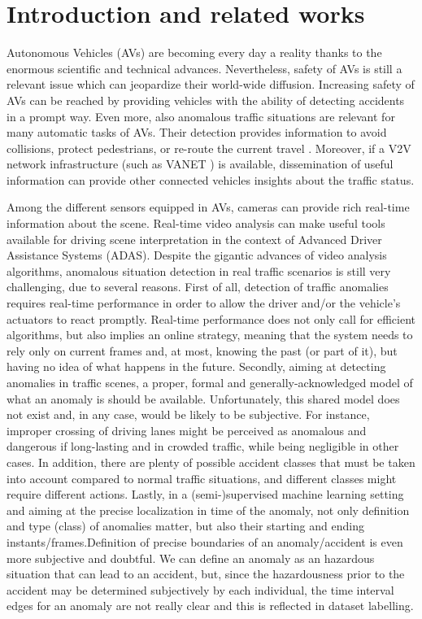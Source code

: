 \section{Introduction and related works}
Autonomous Vehicles (AVs) are becoming every day a reality thanks to the enormous scientific and technical advances. Nevertheless, safety of AVs is still a relevant issue which can jeopardize their world-wide diffusion.
Increasing safety of AVs can be reached by providing vehicles with the ability of detecting accidents in a prompt way.
Even more, also anomalous traffic situations are relevant for many automatic tasks of AVs.
Their detection provides information to avoid collisions, protect pedestrians, or re-route the current travel \cite{4298901}.
Moreover, if a V2V network infrastructure (such as VANET \cite{fatemidokht2021efficient}) is available, dissemination of useful information can provide other connected vehicles insights about the traffic status. 

Among the different sensors equipped in AVs, cameras can provide rich real-time information about the scene.
Real-time video analysis can make useful tools available for driving scene interpretation in the context of Advanced Driver Assistance Systems (ADAS).
Despite the gigantic advances of video analysis algorithms, anomalous situation detection in real traffic scenarios is still very challenging, due to several reasons.
First of all, detection of traffic anomalies requires real-time performance in order to allow the driver and/or the vehicle's actuators to react promptly.
Real-time performance does not only call for efficient algorithms, but also implies an online strategy, meaning that the system needs to rely only on current frames and, at most, knowing the past (or part of it), but having no idea of what happens in the future.
Secondly, aiming at detecting anomalies in traffic scenes, a proper, formal and generally-acknowledged model of what an anomaly is should be available.
Unfortunately, this shared model does not exist and, in any case, would be likely to be subjective.
For instance, improper crossing of driving lanes might be perceived as anomalous and dangerous if long-lasting and in crowded traffic, while being negligible in other cases.
In addition, there are plenty of possible accident classes that must be taken into account compared to normal traffic situations, and different classes might require different actions.
Lastly, in a (semi-)supervised machine learning setting and aiming at the precise localization in time of the anomaly, not only definition and type (class) of anomalies matter, but also their starting and ending instants/frames.Definition of precise boundaries of an anomaly/accident is even more subjective and doubtful. We can define an anomaly as an hazardous situation that can lead to an accident, but, since the hazardousness prior to the accident may be determined subjectively by each individual, the time interval edges for an anomaly are not really clear and this is reflected in dataset labelling.


